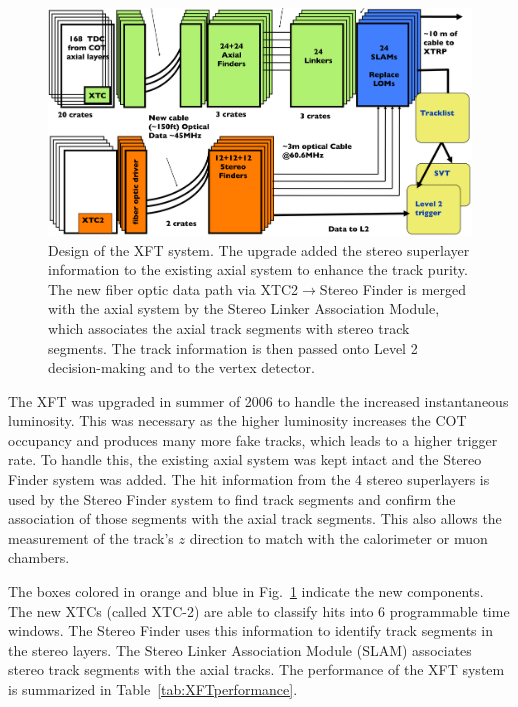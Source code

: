\begin{figure}[htbm!]
 \centering
 \includegraphics[scale=0.14,keepaspectratio=true]{./XFTStructure.png}
 \caption{Design of the XFT system. The upgrade added the stereo superlayer information to the existing axial system to enhance the track purity. The new fiber optic data path via XTC2$\to$Stereo Finder is merged with the axial system by the Stereo Linker Association Module, which associates the axial track segments with stereo track segments. The track information is then passed onto Level 2 decision-making and to the vertex detector.}
 \label{fig:XFTStructure}
\end{figure}
\vspace{-0.01\textheight}

The XFT was upgraded in summer of 2006 to handle the increased instantaneous luminosity. This was necessary as the higher luminosity increases the COT occupancy and produces many more fake tracks, which leads to a higher trigger rate. To handle this, the existing axial system was kept intact and the Stereo Finder system was added. The hit information from the 4 stereo superlayers is used by the Stereo Finder system to find track segments and confirm the association of those segments with the axial track segments. This also allows the measurement of the track's $z$ direction to match with the calorimeter or muon chambers.

The boxes colored in orange and blue in Fig.~\ref{fig:XFTStructure} indicate the new components. The new XTCs (called XTC-2) are able to classify hits into 6 programmable time windows. The Stereo Finder uses this information to identify track segments in the stereo layers. The Stereo Linker Association Module (SLAM) associates stereo track segments with the axial tracks. The performance of the XFT system is summarized in Table~\ref{tab:XFTperformance}.

